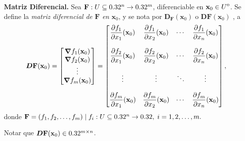 \begin{definition}\label{def:mat_dif}\textbf{Matriz Diferencial.}  Sea $\mathbf{F}:U\subseteq0.32^n\to0.32^m$, diferenciable en $\mathbf{x}_0\in{\kern0ptU}^{\mathrm{o}}$. Se define la \emph{matriz diferencial de $\mathbf{F}$ en $\mathbf{x}_0$}, y se nota por $\boldsymbol{D}_{\mathbf{F}}(\mathbf{x}_0)$ o $\boldsymbol{D}{\mathbf{F}} (\mathbf{x}_0)$ , a
  \[
 \boldsymbol{D}{\mathbf{F}} (\mathbf{x}_0) =
    \begin{bmatrix} 
      \grad{f_1}(\mathbf{x}_0) \\
      \grad{f_2}(\mathbf{x}_0) \\
      \vdots     \\
      \grad{f_m}(\mathbf{x}_0)
    \end{bmatrix}
    =
    \begin{bmatrix} 
      \dfrac{\partial f_1}{\partial x_1}(\mathbf{x}_0) & \dfrac{\partial f_1}{\partial x_2}(\mathbf{x}_0) & \cdots & \dfrac{\partial f_1}{\partial x_n}(\mathbf{x}_0) \\
                     &                &        &                \\
      \dfrac{\partial f_2}{\partial x_1}(\mathbf{x}_0) & \dfrac{\partial f_2}{\partial x_2}(\mathbf{x}_0) & \cdots & \dfrac{\partial f_2}{\partial x_n}(\mathbf{x}_0) \\
                     &                &        &                \\
       \vdots         &  \vdots        & \ddots & \vdots         \\
                     &                &        &                \\
      \dfrac{\partial f_m}{\partial x_1}(\mathbf{x}_0) & \dfrac{\partial f_m}{\partial x_2}(\mathbf{x}_0) & \cdots & \dfrac{\partial f_m}{\partial x_n}(\mathbf{x}_0)
    \end{bmatrix},
  \]
  donde $\mathbf{F}=(f_1, f_2, \dots, f_m)\;|\;f_i:U\subseteq0.32^n\to0.32,\;i=1,2,\dots, m.$
\end{definition}


\begin{obs}
Notar que $\boldsymbol{D}{\mathbf{F}} (\mathbf{x}_0)    \in0.32^{m\times n}$.
\end{obs}



